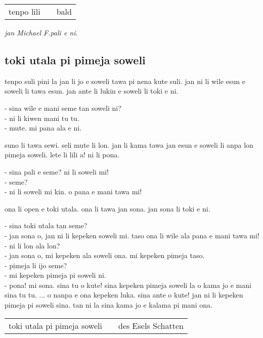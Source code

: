 \begin{supertabular}{p{5,5cm}|ll}
tenpo lili && bald \\
\end{supertabular}

\textit{jan \glqq Michael F.\grqq   pali e ni. \cite{www:failbluedot:01}}
%
\subsection{toki utala pi pimeja soweli}

tenpo suli pini la jan li jo e soweli tawa pi nena kute suli.
jan ni li wile esun e soweli li tawa esun.
jan ante li lukin e soweli li toki e ni.

- sina wile e mani seme tan soweli ni? \\
- ni li kiwen mani tu tu. \\
- mute. mi pana ala e ni. 

suno li tawa sewi.
seli mute li lon.
jan li kama tawa jan esun e soweli li anpa lon pimeja soweli.
lete li lili a!
ni li pona.

- sina pali e seme? ni li soweli mi! \\
- seme?          \\
- ni li soweli mi kin. o pana e mani tawa mi!

ona li open e toki utala. ona li tawa jan sona. jan sona li toki e ni.

- sina toki utala tan seme? \\
- jan sona o, jan ni li kepeken soweli mi. taso ona li wile ala pana e mani tawa mi! \\
- ni li lon ala lon? \\
- jan sona o, mi kepeken ala soweli ona. mi kepeken pimeja taso. \\
- pimeja li ijo seme? \\
- mi kepeken pimeja pi soweli ni. \\
- pona! mi sona. sina tu o kute! sina kepeken pimeja soweli la o kama jo e mani sina tu tu. ...
o nanpa e ona kepeken luka. sina ante o kute! jan ni li kepeken pimeja pi soweli sina. tan ni la sina kama jo e kalama pi mani ona.

\begin{supertabular}{p{5,5cm}|ll}
toki utala pi pimeja soweli && des Esels Schatten \\
\end{supertabular}

